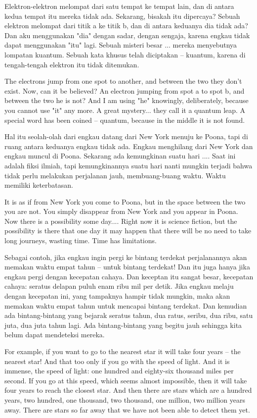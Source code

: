 \bahasa
Elektron-elektron melompat dari satu tempat ke tempat lain, dan di antara kedua tempat itu mereka tidak ada. Sekarang, bisakah itu dipercaya? Sebuah elektron melompat dari titik a ke titik b, dan di antara keduanya dia tidak ada? Dan aku menggunakan "dia" dengan sadar, dengan sengaja, karena engkau tidak dapat menggunakan "itu" lagi. Sebuah misteri besar ... mereka menyebutnya lompatan kuantum. Sebuah kata khusus telah diciptakan -- kuantum, karena di tengah-tengah elektron itu tidak ditemukan.

\english
The electrons jump from one spot to another, and between the two they don't exist. Now, can it be believed? An electron jumping from spot a to spot b, and between the two he is not? And I am using "he" knowingly, deliberately, because you cannot use "it" any more. A great mystery... they call it a quantum leap. A special word has been coined -- quantum, because in the middle it is not found.

\bahasa
Hal itu seolah-olah dari engkau datang dari New York menuju ke Poona, tapi di ruang antara keduanya engkau tidak ada. Engkau menghilang dari New York dan engkau muncul di Poona. Sekarang ada kemungkinan suatu hari .... Saat ini adalah fiksi ilmiah, tapi kemungkinannya suatu hari nanti mungkin terjadi bahwa tidak perlu melakukan perjalanan jauh, membuang-buang waktu. Waktu memiliki keterbatasan.

\english
It is as if from New York you come to Poona, but in the space between the two you are not. You simply disappear from New York and you appear in Poona. Now there is a possibility some day.... Right now it is science fiction, but the possibility is there that one day it may happen that there will be no need to take long journeys, wasting time. Time has limitations.

\bahasa
Sebagai contoh, jika engkau ingin pergi ke bintang terdekat perjalanannya akan memakan waktu empat tahun -- untuk bintang terdekat! Dan itu juga hanya jika engkau pergi dengan kecepatan cahaya. Dan keceptan itu sangat besar, kecepatan cahaya: seratus delapan puluh enam ribu mil per detik. Jika engkau melaju dengan kecepatan ini, yang tampaknya hampir tidak mungkin, maka akan memakan waktu empat tahun untuk mencapai bintang terdekat. Dan kemudian ada bintang-bintang yang bejarak seratus tahun, dua ratus, seribu, dua ribu, satu juta, dua juta tahun lagi. Ada bintang-bintang yang begitu jauh sehingga kita belum dapat mendeteksi mereka.

\english
For example, if you want to go to the nearest star it will take four years -- the nearest star! And that too only if you go with the speed of light. And it is immense, the speed of light: one hundred and eighty-six thousand miles per second. If you go at this speed, which seems almost impossible, then it will take four years to reach the closest star. And then there are stars which are a hundred years, two hundred, one thousand, two thousand, one million, two million years away. There are stars so far away that we have not been able to detect them yet.

